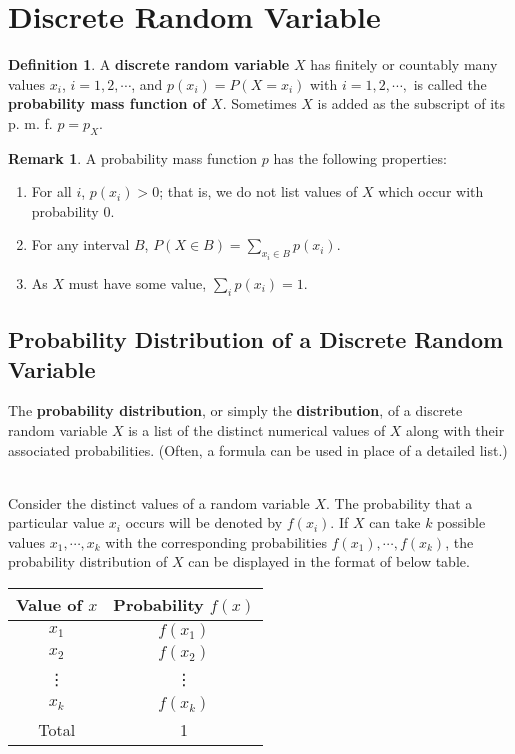 \documentclass[12pt,openany]{book}
\theoremstyle{definition}
\newtheorem{definition}{Definition}[chapter]
\newtheorem{remark}{Remark}[chapter]
\begin{document}
	\section{Discrete Random Variable}
	\begin{tcolorbox}[colframe=defcolor,title={\color{white}\bf Discrete Random Variable}]
		\begin{definition}
			A \textbf{discrete random variable} $X$ has finitely or countably many values $x_i$, $i=1,2,\cdots$, and $p(x_i)=P(X=x_i)$ with $i=1,2,\cdots,$ is called the \textbf{probability mass function of $X$}. Sometimes $X$ is added as the subscript of its p. m. f. $p=p_X$.
		\end{definition}
	\end{tcolorbox}
	\begin{remark}
		A probability mass function $p$ has the following properties:\begin{enumerate}
			\item For all $i$, $p(x_i)>0$; that is, we do not list values of $X$ which occur with probability $0$.
			\item For any interval $B$, $P(X\in B)=\sum_{x_i\in B}p(x_i)$.
			\item As $X$ must have some value, $\sum_ip(x_i)=1$.
		\end{enumerate}
	\end{remark}
	\subsection{Probability Distribution of a Discrete Random Variable}
	
	\begin{tcolorbox}[colback=white]
		The \textbf{probability distribution}, or simply the \textbf{distribution}, of a discrete random variable $X$ is a list of the distinct numerical values of $X$ along with their associated probabilities. (Often, a formula can be used in place of a detailed list.)
	\end{tcolorbox}\
	\\
	Consider the distinct values of a random variable $X$. The probability that a particular value $x_i$ occurs will be denoted by $f(x_i)$. If $X$ can take $k$ possible values $x_1,\cdots,x_k$ with the corresponding probabilities $f(x_1), \cdots, f(x_k)$, the probability distribution of $X$ can be displayed in the format of below table. \begin{center}\begin{tabular}{c|c}
			\toprule[1.2pt]
			Value of $x$ & Probability $f(x)$ \\
			\hline
			$x_1$ & $f(x_1)$ \\
			$x_2$ & $f(x_2)$ \\
			\vdots & \vdots \\
			$x_k$ & $f(x_k)$ \\
			\hline
			Total & 1 \\
			\bottomrule[1.2pt]
		\end{tabular}
	\end{center}
	
\end{document}
